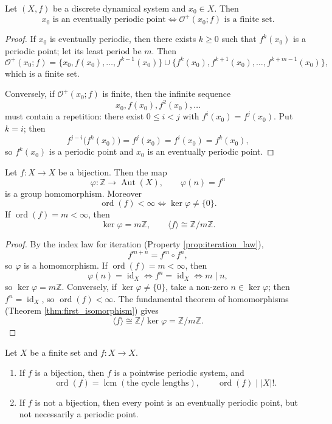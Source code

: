 \begin{proposition}\label{prop:eventually_periodic_orbit}
Let \((X,f)\) be a discrete dynamical system and \(x_0\in X\). Then
\[
x_0\text{ is an eventually periodic point}
\iff
\mathcal O^+(x_0;f)\text{ is a finite set}.
\]
\end{proposition}

\begin{proof}
If \(x_0\) is eventually periodic, then there exists \(k\ge 0\) such that \(f^k(x_0)\) is a periodic point; let its least period be \(m\). Then
\[
\mathcal O^+(x_0;f)
=\{x_0,f(x_0),\dots,f^{k-1}(x_0)\}
\cup
\{f^k(x_0),f^{k+1}(x_0),\dots,f^{k+m-1}(x_0)\},
\]
which is a finite set.

Conversely, if \(\mathcal O^+(x_0;f)\) is finite, then the infinite sequence
\[
x_0,f(x_0),f^2(x_0),\dots
\]
must contain a repetition: there exist \(0\le i<j\) with \(f^i(x_0)=f^j(x_0)\). Put \(k=i\); then
\[
f^{j-i}\bigl(f^k(x_0)\bigr)=f^j(x_0)=f^i(x_0)=f^k(x_0),
\]
so \(f^k(x_0)\) is a periodic point and \(x_0\) is an eventually periodic point.
\end{proof}

\begin{theorem}\label{thm:bijection_group_homomorphism}
Let \(f:X\to X\) be a bijection. Then the map
\[
\varphi:\mathbb Z\to\operatorname{Aut}(X),\qquad
\varphi(n)=f^n
\]
is a group homomorphism. Moreover
\[
\operatorname{ord}(f)<\infty
\iff
\ker\varphi\neq\{0\}.
\]
If \(\operatorname{ord}(f)=m<\infty\), then
\[
\ker\varphi=m\mathbb Z,
\qquad
\langle f\rangle\cong \mathbb Z/m\mathbb Z.
\]
\end{theorem}

\begin{proof}
By the index law for iteration (Property \ref{prop:iteration_law}),
\[
f^{m+n}=f^m\circ f^n,
\]
so \(\varphi\) is a homomorphism. If \(\operatorname{ord}(f)=m<\infty\), then
\[
\varphi(n)=\operatorname{id}_X
\iff
f^n=\operatorname{id}_X
\iff
m\mid n,
\]
so \(\ker\varphi=m\mathbb Z\). Conversely, if \(\ker\varphi\neq\{0\}\), take a non-zero \(n\in\ker\varphi\); then \(f^n=\operatorname{id}_X\), so \(\operatorname{ord}(f)<\infty\). The fundamental theorem of homomorphisms (Theorem \ref{thm:first_isomorphism}) gives
\[
\langle f\rangle\cong \mathbb Z/\ker\varphi=\mathbb Z/m\mathbb Z.
\]
\end{proof}

\begin{corollary}\label{cor:finite_set_period}
Let \(X\) be a finite set and \(f:X\to X\).
\begin{enumerate}[label=(\roman*)]
    \item If \(f\) is a bijection, then \(f\) is a pointwise periodic system, and
    \[
    \operatorname{ord}(f)=\operatorname{lcm}(\text{the cycle lengths}),
    \qquad
    \operatorname{ord}(f)\mid |X|!.
    \]
    \item If \(f\) is not a bijection, then every point is an eventually periodic point, but not necessarily a periodic point.
\end{enumerate}
\end{corollary}

